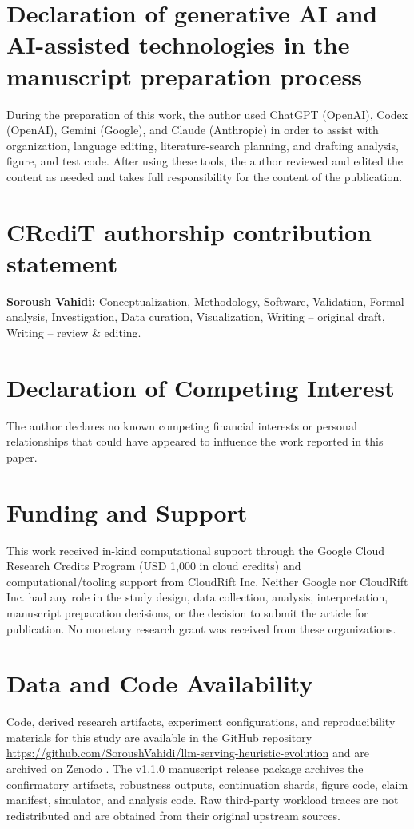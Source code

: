 \documentclass[preprint,12pt]{elsarticle}
\begin{document}
\section*{Declaration of generative AI and AI-assisted technologies in the manuscript preparation process}
During the preparation of this work, the author used ChatGPT (OpenAI), Codex (OpenAI), Gemini (Google), and Claude (Anthropic) in order to assist with organization, language editing, literature-search planning, and drafting analysis, figure, and test code. After using these tools, the author reviewed and edited the content as needed and takes full responsibility for the content of the publication.

\section*{CRediT authorship contribution statement}
\textbf{Soroush Vahidi:} Conceptualization, Methodology, Software, Validation, Formal analysis, Investigation, Data curation, Visualization, Writing -- original draft, Writing -- review \& editing.

\section*{Declaration of Competing Interest}
The author declares no known competing financial interests or personal relationships that could have appeared to influence the work reported in this paper.

\section*{Funding and Support}
This work received in-kind computational support through the Google Cloud Research Credits Program (USD 1,000 in cloud credits) and computational/tooling support from CloudRift Inc. Neither Google nor CloudRift Inc. had any role in the study design, data collection, analysis, interpretation, manuscript preparation decisions, or the decision to submit the article for publication. No monetary research grant was received from these organizations.

\section*{Data and Code Availability}
{\leavevmode\raggedright Code, derived research artifacts, experiment configurations, and reproducibility materials for this study are available in the GitHub repository \url{https://github.com/SoroushVahidi/llm-serving-heuristic-evolution} and are archived on Zenodo \cite{vahidi2026archive}. The v1.1.0 manuscript release package archives the confirmatory artifacts, robustness outputs, continuation shards, figure code, claim manifest, simulator, and analysis code. Raw third-party workload traces are not redistributed and are obtained from their original upstream sources.\par}
\end{document}
